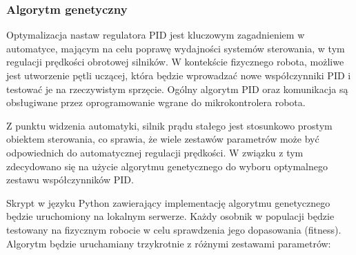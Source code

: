 \documentclass[12pt,twoside]{article}
\begin{document}
\subsubsection{Algorytm genetyczny}

Optymalizacja nastaw regulatora PID jest kluczowym zagadnieniem w automatyce, mającym na celu poprawę wydajności systemów sterowania, w tym regulacji prędkości obrotowej silników. W kontekście fizycznego robota, możliwe jest utworzenie pętli uczącej, która będzie wprowadzać nowe współczynniki PID i testować je na rzeczywistym sprzęcie. Ogólny algorytm PID oraz komunikacja są obsługiwane przez oprogramowanie wgrane do mikrokontrolera robota. 

Z punktu widzenia automatyki, silnik prądu stałego jest stosunkowo prostym obiektem sterowania, co sprawia, że wiele zestawów parametrów może być odpowiednich do automatycznej regulacji prędkości. W związku z tym zdecydowano się na użycie algorytmu genetycznego do wyboru optymalnego zestawu współczynników PID.

Skrypt w języku Python zawierający implementację algorytmu genetycznego będzie uruchomiony na lokalnym serwerze. Każdy osobnik w populacji będzie testowany na fizycznym robocie w celu sprawdzenia jego dopasowania (fitness). Algorytm będzie uruchamiany trzykrotnie z różnymi zestawami parametrów:
\end{document}
